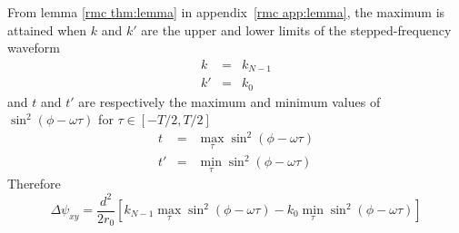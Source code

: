 From lemma \ref{rmc thm:lemma} in appendix~\ref{rmc app:lemma}, the maximum
is attained when $k$ and $k'$ are the upper and lower limits of the stepped-frequency 
waveform
\begin{eqnarray}
k&=&k_{N-1}\\
k'&=&k_0
\end{eqnarray}
and $t$ and $t'$ are respectively the maximum and minimum values of 
$\sin^2(\phi-\omega\tau)$ for $\tau\in[-T/2,T/2]$
\begin{eqnarray}
t&=&\max_{\tau}\sin^2(\phi-\omega\tau)\\
t'&=&\min_{\tau}\sin^2(\phi-\omega\tau)
\end{eqnarray}
Therefore
\begin{equation}
\Delta\psi_{xy}=\frac{d^2}{2r_0}\left[
k_{N-1}\max_{\tau}\sin^2(\phi-\omega\tau)
-k_0\min_{\tau}\sin^2(\phi-\omega\tau)
\right]
\end{equation}

